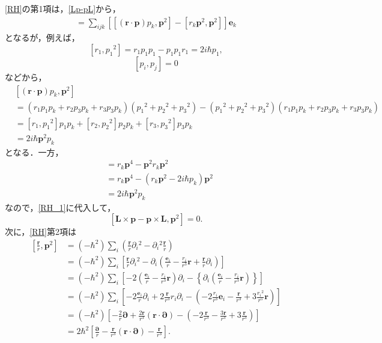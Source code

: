 \eqref{RH}の第1項は，\eqref{Lp-pL}から，
\begin{align}
  [\boldsymbol{L}\times\boldsymbol{p} - \boldsymbol{p}\times\boldsymbol{L},\boldsymbol{p}^2] = \sum_{ijk}\left[[(\boldsymbol{r}\cdot\boldsymbol{p})p_k,\boldsymbol{p}^2] - [r_k\boldsymbol{p}^2,\boldsymbol{p}^2]\right]\boldsymbol{e}_k\label{RH_1}
\end{align}
となるが，例えば，
\[[r_1,p_1{}^2]=r_1p_1p_1 - p_1p_1r_1=2i\hbar p_1,\]
\[[p_i,p_j]=0\]
などから，
\begin{align*}
  & [(\boldsymbol{r}\cdot\boldsymbol{p})p_k,\boldsymbol{p}^2] \\
  & = (r_1p_1p_k + r_2p_3p_k + r_3p_3p_k)(p_1{}^2 + p_2{}^2 + p_3{}^2) - (p_1{}^2 + p_2{}^2 + p_3{}^2)(r_1p_1p_k + r_2p_3p_k + r_3p_3p_k)\\
  & = [r_1,p_1{}^2]p_1p_k + [r_2,p_2{}^2]p_2p_k + [r_3,p_3{}^2]p_3p_k\\
  & = 2i\hbar\boldsymbol{p}^2p_k
\end{align*}
となる．一方，
\begin{align*}
  [r_k\boldsymbol{p}^2,\boldsymbol{p}^2]
  & = r_k\boldsymbol{p}^4 - \boldsymbol{p}^2r_k\boldsymbol{p}^2\\
  & = r_k\boldsymbol{p}^4 - (r_k\boldsymbol{p}^2 - 2i\hbar p_k)\boldsymbol{p}^2\\
  & = 2i\hbar\boldsymbol{p}^2p_k
\end{align*}
なので，\eqref{RH_1}に代入して，
\[[\boldsymbol{L}\times\boldsymbol{p} - \boldsymbol{p}\times\boldsymbol{L},\boldsymbol{p}^2]=0.\]
次に，\eqref{RH}第2項は
\begin{align*}
  \left[\frac{\boldsymbol{r}}{r},\boldsymbol{p}^2\right]
  & = ( - \hbar^2)\sum_i\left(\frac{\boldsymbol{r}}{r}\partial_i{}^2 - \partial_i{}^2\frac{\boldsymbol{r}}{r}\right)\\
  & = ( - \hbar^2)\sum_i\left[\frac{\boldsymbol{r}}{r}\partial_i{}^2 - \partial_i\left(\frac{\boldsymbol{e}_i}{r} - \frac{r_i}{r^3}\boldsymbol{r} + \frac{\boldsymbol{r}}{r}\partial_i\right)\right]\\
  & = ( - \hbar^2)\sum_i\left[ - 2\left(\frac{\boldsymbol{e}_i}{r} - \frac{r_i}{r^3}\boldsymbol{r}\right)\partial_i - \left\{\partial_i\left(\frac{\boldsymbol{e}_i}{r} - \frac{r_i}{r^3}\boldsymbol{r}\right)\right\}\right]\\
  & = ( - \hbar^2)\sum_i\left[ - 2\frac{\boldsymbol{e}_i}{r}\partial_i + 2\frac{\boldsymbol{r}}{r^3}r_i\partial_i - \left( - 2\frac{r_i}{r^3}\boldsymbol{e}_i - \frac{\boldsymbol{r}}{r^3} + 3\frac{r_i{}^2}{r^5}\boldsymbol{r}\right)\right]\\
  & = ( - \hbar^2)\left[ - \frac{2}{r}\boldsymbol{\partial} + \frac{2\boldsymbol{r}}{r^3}(\boldsymbol{r}\cdot\boldsymbol{\partial}) - \left( - 2\frac{\boldsymbol{r}}{r^3} - \frac{3\boldsymbol{r}}{r^3} + 3\frac{\boldsymbol{r}}{r^3}\right)\right]\\
  & = 2\hbar^2\left[\frac{\boldsymbol{\partial}}{r} - \frac{\boldsymbol{r}}{r^3}(\boldsymbol{r}\cdot\boldsymbol{\partial}) - \frac{\boldsymbol{r}}{r^3}\right].
\end{align*}
